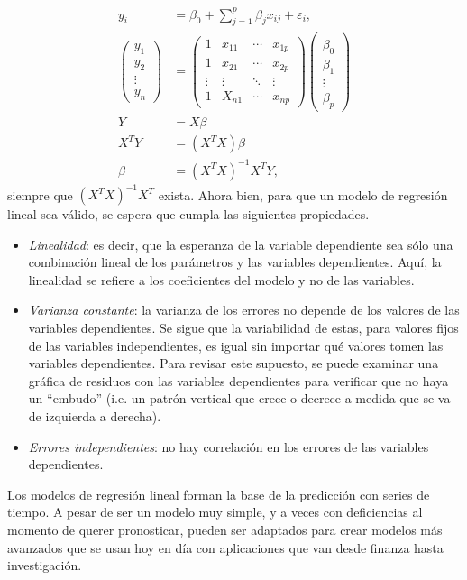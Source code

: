 \documentclass[11pt,letterpaper]{article}
\theoremstyle{definition}
\theoremstyle{theorem}
\theoremstyle{remark}
\begin{document}
	\begin{align*}
		y_i&=\beta_0+\sum_{j=1}^{p}\beta_jx_{ij}+\varepsilon_i, \\
		\begin{pmatrix}y_1\\y_2\\\vdots\\y_n\end{pmatrix}&=\begin{pmatrix}1&x_{11}&\cdots&x_{1p}\\1&x_{21}&\cdots&x_{2p}\\\vdots&\vdots&\ddots&\vdots\\1&X_{n1}&\cdots&x_{np}\end{pmatrix}\begin{pmatrix}\\\beta_0\\\beta_1\\\vdots\\\beta_p\end{pmatrix} \\
		Y&=X\beta \\
		X^TY&=(X^TX)\beta \\
		\beta&=(X^TX)^{-1}X^TY,
	\end{align*}
	siempre que \((X^TX)^{-1}X^T\) exista. Ahora bien, para que un modelo de regresión lineal sea válido, se espera que cumpla las siguientes propiedades.
	\begin{itemize}
		\item \textit{Linealidad}: es decir, que la esperanza de la variable dependiente sea sólo una combinación lineal de los parámetros y las variables dependientes. Aquí, la linealidad se refiere a los coeficientes del modelo y no de las variables.
		\item \textit{Varianza constante}: la varianza de los errores no depende de los valores de las variables dependientes. Se sigue que la variabilidad de estas, para valores fijos de las variables independientes, es igual sin importar qué valores tomen las variables dependientes. Para revisar este supuesto, se puede examinar una gráfica de residuos con las variables dependientes para verificar que no haya un ``embudo'' (i.e. un patrón vertical que crece o decrece a medida que se va de izquierda a derecha).
		\item \textit{Errores independientes}: no hay correlación en los errores de las variables dependientes.
	\end{itemize} \par
	Los modelos de regresión lineal forman la base de la predicción con series de tiempo. A pesar de ser un modelo muy simple, y a veces con deficiencias al momento de querer pronosticar, pueden ser adaptados para crear modelos más avanzados que se usan hoy en día con aplicaciones que van desde finanza hasta investigación.
	\clearpage
\end{document}
